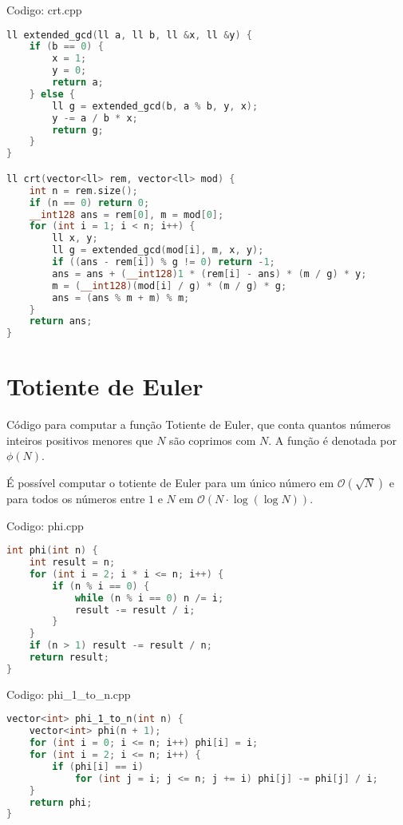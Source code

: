 \documentclass[10pt, a4paper, oneside]{book}
\begin{document}
\hfill

Codigo: crt.cpp

\begin{lstlisting}[language=C++]
ll extended_gcd(ll a, ll b, ll &x, ll &y) {
    if (b == 0) {
        x = 1;
        y = 0;
        return a;
    } else {
        ll g = extended_gcd(b, a % b, y, x);
        y -= a / b * x;
        return g;
    }
}

ll crt(vector<ll> rem, vector<ll> mod) {
    int n = rem.size();
    if (n == 0) return 0;
    __int128 ans = rem[0], m = mod[0];
    for (int i = 1; i < n; i++) {
        ll x, y;
        ll g = extended_gcd(mod[i], m, x, y);
        if ((ans - rem[i]) % g != 0) return -1;
        ans = ans + (__int128)1 * (rem[i] - ans) * (m / g) * y;
        m = (__int128)(mod[i] / g) * (m / g) * g;
        ans = (ans % m + m) % m;
    }
    return ans;
}
\end{lstlisting}
\hfill

\section{Totiente de Euler}


Código para computar a  função Totiente de Euler, que conta quantos números inteiros positivos menores que $N$ são coprimos com $N$. A função é denotada por $\phi(N)$.



É possível computar o totiente de Euler para um único número em $\mathcal{O}(\sqrt{N})$ e para todos os números entre $1$ e $N$ em $\mathcal{O}(N \cdot \log (\log N))$.

\hfill

Codigo: phi.cpp

\begin{lstlisting}[language=C++]
int phi(int n) {
    int result = n;
    for (int i = 2; i * i <= n; i++) {
        if (n % i == 0) {
            while (n % i == 0) n /= i;
            result -= result / i;
        }
    }
    if (n > 1) result -= result / n;
    return result;
}
\end{lstlisting}
\hfill

Codigo: phi\_1\_to\_n.cpp

\begin{lstlisting}[language=C++]
vector<int> phi_1_to_n(int n) {
    vector<int> phi(n + 1);
    for (int i = 0; i <= n; i++) phi[i] = i;
    for (int i = 2; i <= n; i++) {
        if (phi[i] == i)
            for (int j = i; j <= n; j += i) phi[j] -= phi[j] / i;
    }
    return phi;
}
\end{lstlisting}
\hfill
\end{document}
